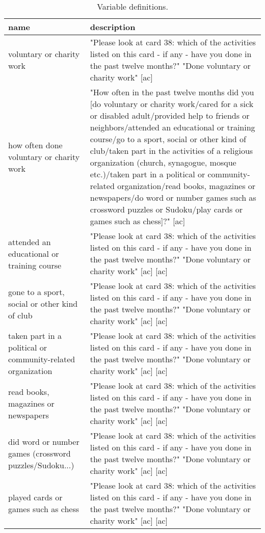 \begin{table}[H]\centering\footnotesize
 \caption{\label{var_des} Variable definitions.}
\begin{tabular} {p{1.5in}p{4.5in}}   \hline
name & description   \\ \hline
  voluntary or charity work & "Please look at card 38: which of the activities listed on this card - if any - have you done in the past twelve months?" "Done voluntary or charity work" [ac] \\
  how often done voluntary or charity work & "How often in the past twelve months did you [do voluntary or charity work/cared for a sick or disabled adult/provided help to friends or neighbors/attended an educational or training course/go to a sport, social or other kind of club/taken part in the activities of a religious organization (church, synagogue, mosque etc.)/taken part in a political or community-related organization/read books, magazines or newspapers/do word or number games such as crossword puzzles or Sudoku/play cards or games such as chess]?" [ac] \\
  attended an educational or training course & "Please look at card 38: which of the activities listed on this card - if any - have you done in the past twelve months?" "Done voluntary or charity work" [ac]  [ac] \\
  gone to a sport, social or other kind of club & "Please look at card 38: which of the activities listed on this card - if any - have you done in the past twelve months?" "Done voluntary or charity work" [ac]  [ac] \\
  taken part in a political or community-related organization & "Please look at card 38: which of the activities listed on this card - if any - have you done in the past twelve months?" "Done voluntary or charity work" [ac]  [ac] \\
  read books, magazines or newspapers & "Please look at card 38: which of the activities listed on this card - if any - have you done in the past twelve months?" "Done voluntary or charity work" [ac]  [ac] \\
  did word or number games (crossword puzzles/Sudoku...) & "Please look at card 38: which of the activities listed on this card - if any - have you done in the past twelve months?" "Done voluntary or charity work" [ac]  [ac] \\
  played cards or games such as chess & "Please look at card 38: which of the activities listed on this card - if any - have you done in the past twelve months?" "Done voluntary or charity work" [ac]  [ac] \\
\hline\end{tabular}\end{table}